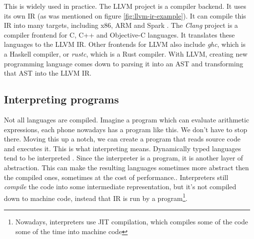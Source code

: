 This is widely used in practice. The LLVM \cite{llvm} project is a compiler backend. It uses its own IR (as was mentioned on figure \ref{fig:llvm-ir-example}).
It can compile this IR into many targets, including x86, ARM and Spark . The \textit{Clang} project is a compiler frontend for C, C++ and Objective-C languages.
It translates these languages to the LLVM IR. Other frontends for LLVM also include \textit{ghc}, which is a Haskell compiler, or \textit{rustc}, which is a Rust compiler.
With LLVM, creating new programming language comes down to parsing it into an AST and transforming that AST into the LLVM IR.

\subsection{Interpreting programs}
Not all languages are compiled. Imagine a program which can evaluate arithmetic expressions, each phone nowadays has a program like this.
We don't have to stop there. Moving this up a notch, we can create a program that reads source code and executes it.
This is what interpreting means. Dynamically typed languages tend to be interpreted \cite{python, lua, javascript}. Since the interpreter is a program, it is another layer of abstraction. This can make
the resulting languages sometimes more abstract then the compiled ones, sometimes at the cost of performance..
Interpreters still \textit{compile} the code into some intermediate representation, but it's not compiled down to machine code, instead that IR is run by a program\footnote{Nowadays, interpreters use JIT compilation, which compiles some of the code some of the time into machine code}.
